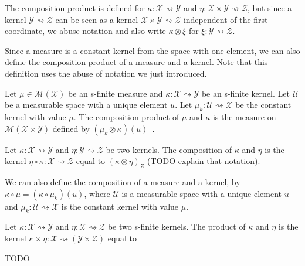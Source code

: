 The composition-product is defined for $\kappa : \mathcal X \rightsquigarrow \mathcal Y$ and $\eta : \mathcal X \times \mathcal Y \rightsquigarrow \mathcal Z$, but since a kernel $\mathcal Y \rightsquigarrow \mathcal Z$ can be seen as a kernel $\mathcal X \times \mathcal Y \rightsquigarrow \mathcal Z$ independent of the first coordinate, we abuse notation and also write $\kappa \otimes \xi$ for $\xi : \mathcal Y \rightsquigarrow \mathcal Z$.

Since a measure is a constant kernel from the space with one element, we can also define the composition-product of a measure and a kernel. Note that this definition uses the abuse of notation we just introduced.

\begin{definition}
  \label{def:measure_compProd}
  \leanok
  Let $\mu \in \mathcal M(\mathcal X)$ be an s-finite measure and $\kappa : \mathcal X \rightsquigarrow \mathcal Y$ be an s-finite kernel.
  Let $\mathcal U$ be a measurable space with a unique element $u$. Let $\mu_k : \mathcal U \rightsquigarrow \mathcal X$ be the constant kernel with value $\mu$.
  The composition-product of $\mu$ and $\kappa$ is the measure on $\mathcal M(\mathcal X \times \mathcal Y)$ defined by $(\mu_k \otimes \kappa) (u)$~.
\end{definition}

\begin{definition}[Composition]
  \label{def:kernel_comp}
  \leanok
  Let $\kappa : \mathcal X \rightsquigarrow \mathcal Y$ and $\eta : \mathcal Y \rightsquigarrow \mathcal Z$ be two kernels.
  The composition of $\kappa$ and $\eta$ is the kernel $\eta \circ \kappa : \mathcal X \rightsquigarrow \mathcal Z$ equal to $(\kappa \otimes \eta)_Z$ (TODO explain that notation).
\end{definition}

We can also define the composition of a measure and a kernel, by $\kappa \circ \mu = (\kappa \circ \mu_k) (u)$, where $\mathcal U$ is a measurable space with a unique element $u$ and $\mu_k : \mathcal U \rightsquigarrow \mathcal X$ is the constant kernel with value $\mu$.

\begin{definition}[Product]
  \label{def:kernel_prod}
  \leanok
  Let $\kappa : \mathcal X \rightsquigarrow \mathcal Y$ and $\eta : \mathcal X \rightsquigarrow \mathcal Z$ be two s-finite kernels.
  The product of $\kappa$ and $\eta$ is the kernel $\kappa \times \eta : \mathcal X \rightsquigarrow (\mathcal Y \times \mathcal Z)$ equal to

  TODO
\end{definition}

